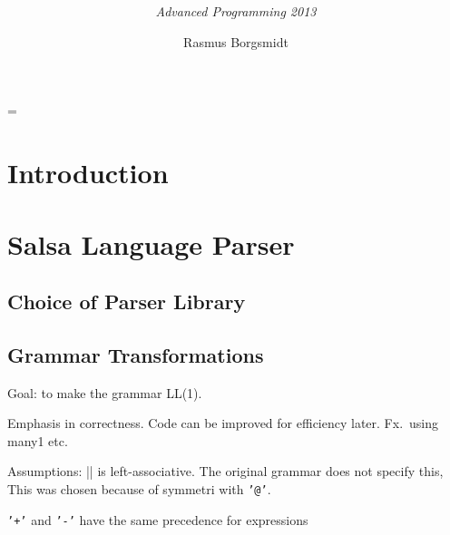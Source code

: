 \documentclass[
paper=a4,
oneside,
fontsize=11pt,
numbers=noenddot,
headinclude=false, %
footinclude=false, %
fleqn,             %
DIV=8
]{scrartcl}
\DeclareRobustCommand{\spacedlowsmallcaps}[1]{\MakeTextLowercase{\textsc{\lowsmallcapsspacing{#1}}}}%
\let\lstlistoflistings\listoflistings%
\begin{document}
\title{\textcolor{spot}{\rmfamily\mdseries\spacedlowsmallcaps{Exam Report}}}
\subtitle{\rmfamily\mdseries\itshape\normalsize{Advanced Programming 2013}}
\author{\large Rasmus Borgsmidt}
\date{}
\vspace{-30pt}\maketitle
{}
\setcounter{tocdepth}{2} %
\manualmark
\vspace{-30pt}\tableofcontents

\lstlistoflistings

\listoftables

\font%
\font%
\font=\font%

\section*{Introduction}

\section{Salsa Language Parser}

\subsection{Choice of Parser Library}

\subsection{Grammar Transformations}

Goal: to make the grammar {\regnum LL(1)}.

Emphasis in correctness. Code can be improved for efficiency later. Fx.\ using
many1 etc.

Assumptions: || is left-associative. The original grammar does not specify this,
This was chosen because of symmetri with {\tt '@'}.

{\tt '+'} and {\tt '-'} have the same precedence for expressions
\end{document}
